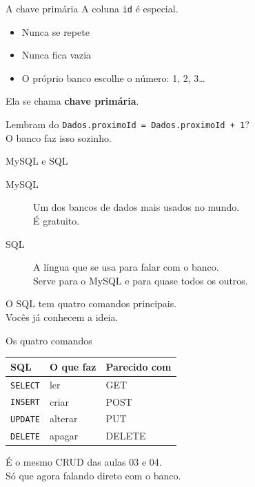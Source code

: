 \documentclass[aspectratio=169,11pt]{beamer}
\begin{document}
\begin{frame}{A chave primária}
  A coluna \texttt{id} é especial.

  \vspace{0.4em}
  \begin{itemize}
    \item Nunca se repete
    \item Nunca fica vazia
    \item O próprio banco escolhe o número: 1, 2, 3\ldots
  \end{itemize}

  \vspace{0.5em}
  Ela se chama \textbf{chave primária}.

  \vspace{0.5em}
  Lembram do \texttt{Dados.proximoId = Dados.proximoId + 1}?\\
  O banco faz isso sozinho.
\end{frame}

\begin{frame}{MySQL e SQL}
  \begin{description}
    \item[MySQL] Um dos bancos de dados mais usados no mundo.\\
      É gratuito.
    \item[SQL] A língua que se usa para falar com o banco.\\
      Serve para o MySQL e para quase todos os outros.
  \end{description}

  \vspace{0.6em}
  O SQL tem quatro comandos principais.\\
  Vocês já conhecem a ideia.
\end{frame}

\begin{frame}{Os quatro comandos}
  \begin{center}
  \begin{tabular}{lll}
    \toprule
    SQL & O que faz & Parecido com \\
    \midrule
    \texttt{SELECT} & ler & GET \\
    \texttt{INSERT} & criar & POST \\
    \texttt{UPDATE} & alterar & PUT \\
    \texttt{DELETE} & apagar & DELETE \\
    \bottomrule
  \end{tabular}
  \end{center}

  \vspace{0.6em}
  É o mesmo CRUD das aulas 03 e 04.\\
  Só que agora falando direto com o banco.
\end{frame}
\end{document}
